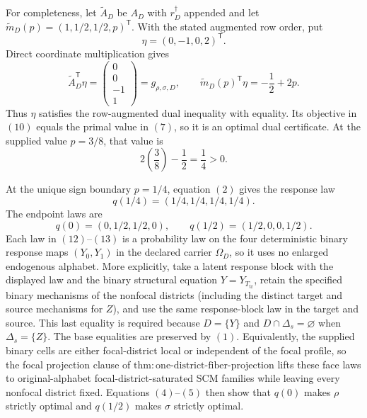 For completeness, let \(\widetilde A_D\) be \(A_D\) with
\(r_D^\dagger\) appended and let
\(\widetilde m_D(p)=(1,1/2,1/2,p)^{\mathsf T}\).  With the stated augmented
row order, put
\[
\eta=(0,-1,0,2)^{\mathsf T}.
\]
Direct coordinate multiplication gives
\[
\widetilde A_D^{\mathsf T}\eta
=\begin{pmatrix}0\\0\\-1\\1\end{pmatrix}
=g_{\rho,\sigma,D},
\qquad
\widetilde m_D(p)^{\mathsf T}\eta
=-\frac12+2p.
\tag{10}
\]
Thus \(\eta\) satisfies the row-augmented dual inequality with equality.
Its objective in \((10)\) equals the primal value in \((7)\), so it is an
optimal dual certificate.  At the supplied value \(p=3/8\), that value is
\[
2\left(\frac38\right)-\frac12=\frac14>0.
\tag{11}
\]

At the unique sign boundary \(p=1/4\), equation \((2)\) gives the response
law
\[
q(1/4)=(1/4,1/4,1/4,1/4).
\tag{12}
\]
The endpoint laws are
\[
q(0)=(0,1/2,1/2,0),
\qquad
q(1/2)=(1/2,0,0,1/2).
\tag{13}
\]
Each law in \((12)\)--\((13)\) is a probability law on the four deterministic
binary response maps \((Y_0,Y_1)\) in the declared carrier \(\Omega_D\), so
it uses no enlarged endogenous alphabet.  More explicitly, take a latent
response block with the displayed law and the binary structural equation
\(Y=Y_{T_{\mathrm{tr}}}\), retain the specified binary mechanisms of the
nonfocal districts (including the distinct target and source mechanisms for
\(Z\)), and use the same response-block law in the target and source.  This
last equality is required because
\(D=\{Y\}\) and \(D\cap\Delta_s=\varnothing\) when
\(\Delta_s=\{Z\}\).  The base equalities are preserved by \((1)\).
Equivalently, the supplied binary cells are either focal-district local or
independent of the focal profile, so the focal projection clause of
\(\mathrm{thm:one\text{-}district\text{-}fiber\text{-}projection}\) lifts
these face laws to original-alphabet focal-district-saturated SCM families
while leaving every nonfocal district fixed.  Equations \((4)\)--\((5)\)
then show that \(q(0)\) makes \(\rho\) strictly optimal and \(q(1/2)\)
makes \(\sigma\) strictly optimal.

